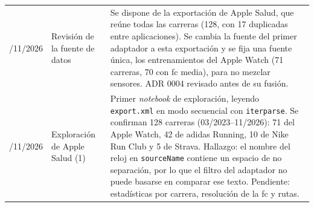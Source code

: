 \begin{longtable}{@{}>{\raggedright\arraybackslash}p{2.1cm}>{\raggedright\arraybackslash}p{4.2cm}>{\raggedright\arraybackslash}p{7.7cm}@{}}
12/11/2026 & Revisión de la fuente de datos & Se dispone de la exportación de Apple Salud, que reúne todas las carreras (128, con 17 duplicadas entre aplicaciones). Se cambia la fuente del primer adaptador a esta exportación y se fija una fuente única, los entrenamientos del Apple Watch (71 carreras, 70 con \gls{fc} media), para no mezclar sensores. ADR 0004 revisado antes de su fusión. \\
12/11/2026 & Exploración de Apple Salud (1) & Primer \textit{notebook} de exploración, leyendo \texttt{export.xml} en modo secuencial con \texttt{iterparse}. Se confirman 128 carreras (03/2023--11/2026): 71 del Apple Watch, 42 de adidas Running, 10 de Nike Run Club y 5 de Strava. Hallazgo: el nombre del reloj en \texttt{sourceName} contiene un espacio de no separación, por lo que el filtro del adaptador no puede basarse en comparar ese texto. Pendiente: estadísticas por carrera, resolución de la \gls{fc} y rutas. \\
\end{longtable}
